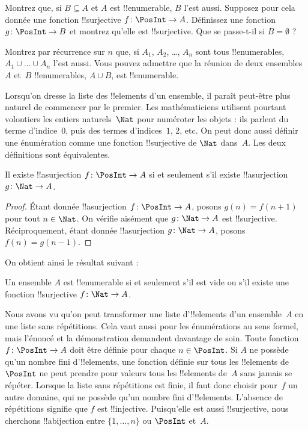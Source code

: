 \documentclass[../../../include/open-logic-section]{subfiles}
\begin{document}
\begin{prob}
Montrez que, si $B \subseteq A$ et $A$ est !!{enumerable}, $B$ l’est
aussi. Supposez pour cela donnée une fonction !!{surjective}
$f\colon \PosInt \to A$. Définissez une fonction~$g\colon \PosInt \to B$
et montrez qu’elle est !!{surjective}. Que se passe-t-il si
$B = \emptyset$ ?
\end{prob}

\begin{prob}
Montrez par récurrence sur $n$ que, si $A_1$, $A_2$, \dots, $A_n$ sont
tous !!{enumerable}s, $A_1 \cup \dots \cup A_n$ l’est aussi.
Vous pouvez admettre que la réunion de deux ensembles $A$ et~$B$
!!{enumerable}s, $A \cup B$, est !!{enumerable}.
\end{prob}

Lorsqu’on dresse la liste des !!{element}s d’un ensemble, il paraît
peut-être plus naturel de commencer par le premier. Les mathématiciens
utilisent pourtant volontiers les entiers naturels~$\Nat$ pour
numéroter les objets : ils parlent du terme d’indice~$0$, puis des
termes d’indices~$1$, $2$, etc. On peut donc aussi définir une énumération
comme une fonction !!{surjective} de $\Nat$ dans~$A$.
Les deux définitions sont équivalentes.

\begin{prop}
Il existe !!a{surjection} $f\colon \PosInt \to A$ si et seulement
s’il existe !!a{surjection} $g\colon \Nat \to A$.
\end{prop}

\begin{proof}
Étant donnée !!a{surjection} $f\colon \PosInt \to A$, posons
$g(n) = f(n+1)$ pour tout $n \in \Nat$. On vérifie aisément que
$g\colon \Nat \to A$ est !!{surjective}. Réciproquement, étant donnée
!!a{surjection} $g\colon \Nat \to A$, posons $f(n) = g(n-1)$.
\end{proof}

On obtient ainsi le résultat suivant :

\begin{cor}
Un ensemble $A$ est !!{enumerable} si et seulement s’il est vide
ou s’il existe une fonction !!{surjective} $f\colon \Nat \to A$.
\end{cor}

Nous avons vu qu’on peut transformer une liste d’!!{element}s
d’un ensemble~$A$ en une liste sans répétitions. Cela vaut aussi pour
les énumérations au sens formel, mais l’énoncé et la démonstration
demandent davantage de soin. Toute fonction $f\colon \PosInt \to A$
doit être définie pour chaque $n \in \PosInt$. Si $A$ ne possède
qu’un nombre fini d’!!{element}s, une fonction définie sur tous les
!!{element}s de $\PosInt$ ne peut prendre pour valeurs tous les
!!{element}s de~$A$ sans jamais se répéter. Lorsque la liste sans
répétitions est finie, il faut donc choisir pour~$f$ un autre domaine,
qui ne possède qu’un nombre fini d’!!{element}s. L’absence de répétitions
signifie que $f$ est !!{injective}. Puisqu’elle est aussi !!{surjective},
nous cherchons !!a{bijection} entre $\{1, \dots, n\}$ ou $\PosInt$ et~$A$.
\end{document}

